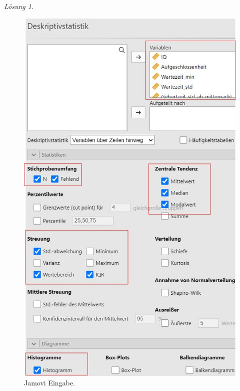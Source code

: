 \documentclass[
]{book}
\theoremstyle{definition}
\theoremstyle{definition}
\theoremstyle{definition}
\theoremstyle{definition}
\theoremstyle{remark}
\newtheorem*{solution}{Lösung}
\begin{document}
\begin{solution}
\leavevmode

\begin{figure}

{\centering \includegraphics[width=1\linewidth]{figures/02-exr-diverse-distrib-input} 

}

\caption{Jamovi Eingabe.}\label{fig:sol-diverse-distrib1}
\end{figure}

\begin{figure}


\end{figure}
\end{solution}
\end{document}
